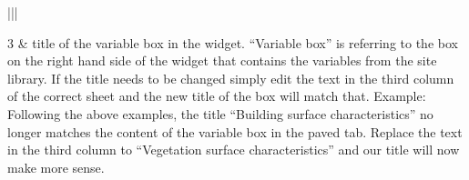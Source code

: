 \documentclass[letterpaper,10pt,english]{sphinxmanual}
\begin{document}
\begin{savenotes}\sphinxattablestart
\centering
\begin{tabular}[t]{|||}
\hline

3
&
title of the variable box in the widget. “Variable box” is referring to the box on the right hand side of the widget that contains the variables from the site library. If the title needs to be changed simply edit the text in the third column of the correct sheet and the new title of the box will match that. Example: Following the above examples, the title “Building surface characteristics” no longer matches the content of the variable box in the paved tab. Replace the text in the third column to “Vegetation surface characteristics” and our title will now make more sense.   
\\
\hline
\end{tabular}
\par
\sphinxattableend\end{savenotes}
\end{document}
